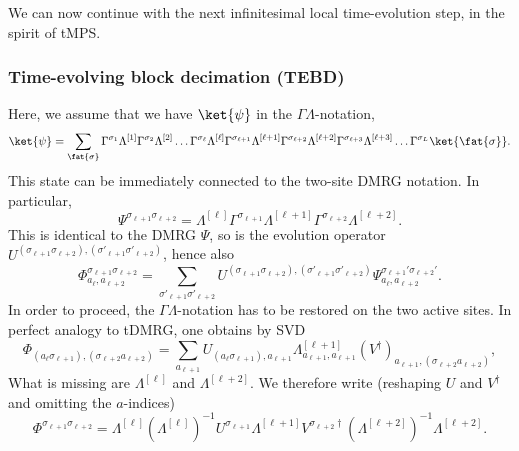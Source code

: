 We can now continue with the next infinitesimal local time-evolution step, in the spirit of tMPS.   
\subsubsection{Time-evolving block decimation (TEBD)}
Here, we assume that we have $\ket{\psi}$ in the $\Gamma\Lambda$-notation,
\begin{equation}
\ket{\psi} = \sum_{\fat{\sigma}} 
\Gamma^{\sigma_1} \Lambda^{[1]} \Gamma^{\sigma_2} \Lambda^{[2]} \ldots
\Gamma^{\sigma_{\ell}} \Lambda^{[\ell]}  \Gamma^{\sigma_{\ell+1}} \Lambda^{[\ell+1]}
\Gamma^{\sigma_{\ell+2}} \Lambda^{[\ell+2]}  \Gamma^{\sigma_{\ell+3}} \Lambda^{[\ell+3]} \ldots
\Gamma^{\sigma_L}   
\ket{\fat{\sigma}}.
\label{eq:TEBDstart}
\end{equation}
This state can be immediately connected to the two-site DMRG notation. In particular,
\begin{equation}
\Psi^{\sigma_{\ell+1} \sigma_{\ell+2}} = \Lambda^{[\ell]}  \Gamma^{\sigma_{\ell+1}} \Lambda^{[\ell+1]}
\Gamma^{\sigma_{\ell+2}} \Lambda^{[\ell+2]}  .
\end{equation}
This is identical to the DMRG $\Psi$, so is the evolution operator $U^{(\sigma_{\ell+1} \sigma_{\ell+2}), (\sigma'_{\ell+1} \sigma'_{\ell+2})}$, hence also  
\begin{equation}
\Phi^{\sigma_{\ell+1}\sigma_{\ell+2}}_{a_\ell, a_{\ell+2}} = \sum_{\sigma'_{\ell+1} \sigma'_{\ell+2}}
U^{(\sigma_{\ell+1} \sigma_{\ell+2}), (\sigma'_{\ell+1} \sigma'_{\ell+2})}  \Psi^{\sigma_{\ell+1}'\sigma_{\ell+2}'}_{a_\ell, a_{\ell+2}} . 
\end{equation} 
In order to proceed, the $\Gamma\Lambda$-notation has to be restored on the two active sites. In perfect analogy to tDMRG, one obtains by SVD
\begin{equation}
\Phi_{(a_\ell \sigma_{\ell+1}), (\sigma_{\ell+2} a_{\ell+2})} = \sum_{a_{\ell+1}} U_{(a_\ell \sigma_{\ell+1}),a_{\ell+1}} \Lambda^{[\ell+1]}_{a_{\ell+1},a_{\ell+1}} (V^\dagger)_{a_{\ell+1}, (\sigma_{\ell+2} a_{\ell+2})} ,
\end{equation}
What is missing are $\Lambda^{[\ell]}$ and $\Lambda^{[\ell+2]}$. We therefore write (reshaping $U$ and $V^\dagger$ and omitting the $a$-indices)
\begin{equation}
\Phi^{\sigma_{\ell+1}\sigma_{\ell+2}} = \Lambda^{[\ell]} (\Lambda^{[\ell]})^{-1} U^{\sigma_{\ell+1}} 
 \Lambda^{[\ell+1]} V^{\sigma_{\ell+2}\dagger} ( \Lambda^{[\ell+2]})^{-1}  \Lambda^{[\ell+2]} .
\end{equation}
